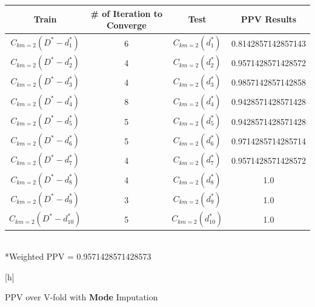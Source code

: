 \documentclass{article}
\begin{document}
\begin{enumerate}
\begin{table}[h]
				\centering
				\begin{tabular}{c||c| c|c}
					\\
					\hline
					Train & \# of Iteration to Converge & Test & PPV Results\\
					\hline
					$C_{km=2}(D^* - d^*_1)$ & 6 & $C_{km=2}( d^*_1)$&0.8142857142857143\\
					$C_{km=2}(D^* - d^*_2)$ & 4 & $C_{km=2}( d^*_2)$&0.9571428571428572\\
					$C_{km=2}(D^* - d^*_3)$ & 4 & $C_{km=2}( d^*_3)$&0.9857142857142858\\
					$C_{km=2}(D^* - d^*_4)$ & 8 & $C_{km=2}( d^*_4)$&0.9428571428571428\\
					$C_{km=2}(D^* - d^*_5)$ & 5 & $C_{km=2}( d^*_5)$&0.9428571428571428\\
					$C_{km=2}(D^* - d^*_6)$ & 5 & $C_{km=2}( d^*_6)$&0.9714285714285714\\
					$C_{km=2}(D^* - d^*_7)$ & 4 & $C_{km=2}( d^*_7)$&0.9571428571428572\\
					$C_{km=2}(D^* - d^*_8)$ & 4 & $C_{km=2}( d^*_8)$&1.0\\
					$C_{km=2}(D^* - d^*_9)$ & 3 & $C_{km=2}( d^*_9)$ &1.0\\
					$C_{km=2}(D^* - d^*_10)$ & 5 & $C_{km=2}( d^*_10)$&1.0\\
					\hline	
				\end{tabular} \\
				*Weighted PPV = 0.9571428571428573
			\end{table}[h] \\			

			\begin{table}[h]
				\caption{PPV over V-fold with \textbf{Mode} Imputation}


\end{table}
\end{enumerate}
\end{document}
